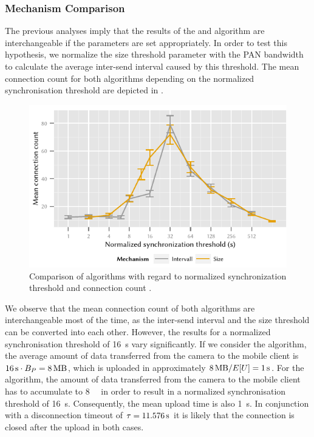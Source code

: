 \subsubsection*{Mechanism Comparison}\label{sec:application:cloud_file_synchronisation:numerical_evaluation:mechanism_comparison}
The previous analyses imply that the results of the \algointerval and \algosize algorithm are interchangeable if the parameters are set appropriately.
In order to test this hypothesis, we normalize the size threshold parameter with the \gls{PAN} bandwidth to calculate the average inter-send interval caused by this threshold.
The mean connection count \connectionCount for both algorithms depending on the normalized synchronisation threshold are depicted in . 
\begin{figure}
  \includegraphics{application/cloud_file_synchronization/numerical_evaluation/figures/comparison}
  \caption{Comparison of algorithms with regard to normalized synchronization threshold and connection count \connectionCount.}
  \label{fig:application:cloud_file_synchronisation:numerical_evaluation:mechanism_comparison:comparison}
\end{figure}

We observe that the mean connection count \connectionCount of both algorithms are interchangeable most of the time, as the inter-send interval and the size threshold can be converted into each other.
However, the results for a normalized synchronisation threshold of \SI{16}{\second} vary significantly.
If we consider the \algointerval algorithm, the average amount of data transferred from the camera to the mobile client is \(\SI{16}{\second} \cdot \panTransferRate=\SI{8}{\mega\byte}\), which is uploaded in approximately \(\SI{8}{\mega\byte} / E[U] = \SI{1}{\second}\).
For the \algosize algorithm, the amount of data transferred from the camera to the mobile client has to accumulate to \SI{8}{\mega\byte} in order to result in a normalized synchronisation threshold of \SI{16}{\second}.
Consequently, the mean upload time is also \SI{1}{\second}.
In conjunction with a disconnection timeout of \(\tau = \SI{11.576}{\second}\) it is likely that the connection is closed after the upload in both cases.


